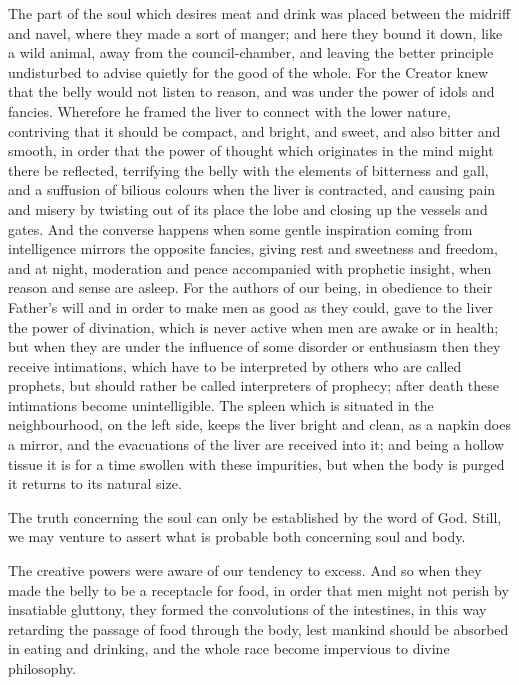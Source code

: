 \documentclass[11pt,letter]{article}
\begin{document}
\par  The part of the soul which desires meat and drink was placed between the midriff and navel, where they made a sort of manger; and here they bound it down, like a wild animal, away from the council-chamber, and leaving the better principle undisturbed to advise quietly for the good of the whole. For the Creator knew that the belly would not listen to reason, and was under the power of idols and fancies. Wherefore he framed the liver to connect with the lower nature, contriving that it should be compact, and bright, and sweet, and also bitter and smooth, in order that the power of thought which originates in the mind might there be reflected, terrifying the belly with the elements of bitterness and gall, and a suffusion of bilious colours when the liver is contracted, and causing pain and misery by twisting out of its place the lobe and closing up the vessels and gates. And the converse happens when some gentle inspiration coming from intelligence mirrors the opposite fancies, giving rest and sweetness and freedom, and at night, moderation and peace accompanied with prophetic insight, when reason and sense are asleep. For the authors of our being, in obedience to their Father’s will and in order to make men as good as they could, gave to the liver the power of divination, which is never active when men are awake or in health; but when they are under the influence of some disorder or enthusiasm then they receive intimations, which have to be interpreted by others who are called prophets, but should rather be called interpreters of prophecy; after death these intimations become unintelligible. The spleen which is situated in the neighbourhood, on the left side, keeps the liver bright and clean, as a napkin does a mirror, and the evacuations of the liver are received into it; and being a hollow tissue it is for a time swollen with these impurities, but when the body is purged it returns to its natural size.

\par  The truth concerning the soul can only be established by the word of God. Still, we may venture to assert what is probable both concerning soul and body.

\par  The creative powers were aware of our tendency to excess. And so when they made the belly to be a receptacle for food, in order that men might not perish by insatiable gluttony, they formed the convolutions of the intestines, in this way retarding the passage of food through the body, lest mankind should be absorbed in eating and drinking, and the whole race become impervious to divine philosophy.
\end{document}
